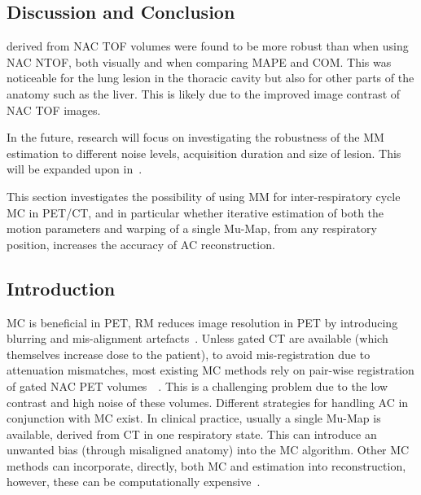         \subsection{Discussion and Conclusion} \label{sec:impact_of_tof_on_respiratory_motion_model_estimation_using_pre_gated_no_intra_cycle_motion_nac_pet_discussion_and_conclusion}
             derived from \gls{NAC} \gls{TOF} volumes were found to be more robust than when using \gls{NAC} \gls{NTOF}, both visually and when comparing \gls{MAPE} and \gls{COM}. This was noticeable for the lung lesion in the thoracic cavity but also for other parts of the anatomy such as the liver. This is likely due to the improved image contrast of \gls{NAC} \gls{TOF} images.

            In the future, research will focus on investigating the robustness of the \gls{MM} estimation to different noise levels, acquisition duration and size of lesion. This will be expanded upon in~.
    
        This section investigates the possibility of using \gls{MM} for inter-respiratory cycle \gls{MC} in \gls{PET}/\gls{CT}, and in particular whether iterative estimation of both the motion parameters and warping of a single \gls{Mu-Map}, from any respiratory position, increases the accuracy of \gls{AC} reconstruction.
        
        \subsection{Introduction} \label{sec:pet_ct_respiratory_motion_correction_with_a_single_attenuation_map_using_nac_derived_deformation_fields_introduction}
            \gls{MC} is beneficial in \gls{PET}, \gls{RM} reduces image resolution in \gls{PET} by introducing blurring and mis-alignment artefacts~. Unless gated \gls{CT} are available (which themselves increase dose to the patient), to avoid mis-registration due to attenuation mismatches, most existing \gls{MC} methods rely on pair-wise registration of gated \gls{NAC} \gls{PET} volumes~~. This is a challenging problem due to the low contrast and high noise of these volumes. Different strategies for handling \gls{AC} in conjunction with \gls{MC} exist. In clinical practice, usually a single \gls{Mu-Map} is available, derived from \gls{CT} in one respiratory state. This can introduce an unwanted bias (through misaligned anatomy) into the \gls{MC} algorithm. Other \gls{MC} methods can incorporate, directly, both \gls{MC} and  estimation into reconstruction, however, these can be computationally expensive~.
            
